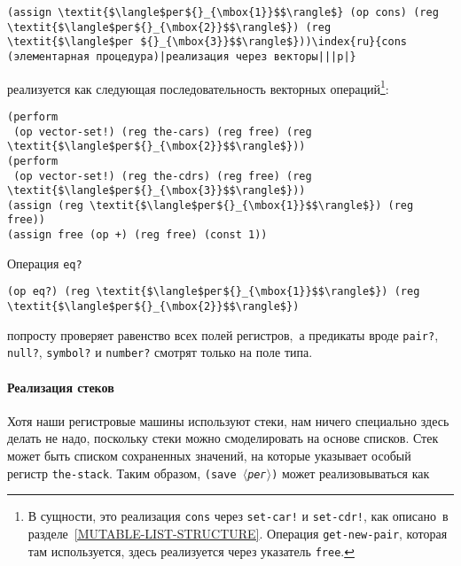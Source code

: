 \begin{Verbatim}[fontsize=\small]
(assign \textit{$\langle$рег${}_{\mbox{1}}$$\rangle$} (op cons) (reg \textit{$\langle$рег${}_{\mbox{2}}$$\rangle$}) (reg \textit{$\langle$рег ${}_{\mbox{3}}$$\rangle$}))\index{ru}{cons (элементарная процедура)|реализация через векторы|||p|}
\end{Verbatim}
реализуется как следующая последовательность векторных операций\footnote{В сущности, это реализация {\tt cons} через
{\tt set-car!} и {\tt set-cdr!}, как описано~в 
разделе~\ref{MUTABLE-LIST-STRUCTURE}.  Операция
{\tt get-new-pair}, которая там используется, здесь реализуется
через указатель {\tt free}.
}:

\begin{Verbatim}[fontsize=\small]
(perform
 (op vector-set!) (reg the-cars) (reg free) (reg \textit{$\langle$рег${}_{\mbox{2}}$$\rangle$}))
(perform
 (op vector-set!) (reg the-cdrs) (reg free) (reg \textit{$\langle$рег${}_{\mbox{3}}$$\rangle$}))
(assign (reg \textit{$\langle$рег${}_{\mbox{1}}$$\rangle$}) (reg free))
(assign free (op +) (reg free) (const 1))
\end{Verbatim}
Операция {\tt eq?}

\begin{Verbatim}[fontsize=\small]
(op eq?) (reg \textit{$\langle$рег${}_{\mbox{1}}$$\rangle$}) (reg \textit{$\langle$рег${}_{\mbox{2}}$$\rangle$})
\end{Verbatim}
попросту проверяет равенство всех полей регистров,~а предикаты вроде
{\tt pair?}, 
{\tt null?}, 
{\tt symbol?} и
{\tt number?} 
смотрят только на поле типа.

\paragraph{Реализация стеков}


 Хотя наши регистровые машины используют стеки, нам ничего
специально здесь делать не надо, поскольку стеки можно смоделировать
на основе списков.  Стек может быть списком сохраненных значений, на
которые указывает особый регистр {\tt the-stack}.  
Таким
образом, {\tt (save \textit{$\langle$рег$\rangle$})} может
реализовываться как

